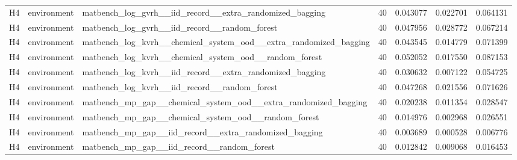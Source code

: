 \documentclass[10pt]{article}
\begin{document}
\begin{landscape}
\begin{longtable}{L{.35in}L{.6in}L{3.55in}L{.4in}L{.88in}L{.88in}L{.88in}}
H4 & environment & matbench\_\allowbreak{}log\_\allowbreak{}gvrh\_\allowbreak{}\_\allowbreak{}iid\_\allowbreak{}record\_\allowbreak{}\_\allowbreak{}extra\_\allowbreak{}randomized\_\allowbreak{}bagging & 40 & 0.043077 & 0.022701 & 0.064131\\
H4 & environment & matbench\_\allowbreak{}log\_\allowbreak{}gvrh\_\allowbreak{}\_\allowbreak{}iid\_\allowbreak{}record\_\allowbreak{}\_\allowbreak{}random\_\allowbreak{}forest & 40 & 0.047956 & 0.028772 & 0.067214\\
H4 & environment & matbench\_\allowbreak{}log\_\allowbreak{}kvrh\_\allowbreak{}\_\allowbreak{}chemical\_\allowbreak{}system\_\allowbreak{}ood\_\allowbreak{}\_\allowbreak{}extra\_\allowbreak{}randomized\_\allowbreak{}bagging & 40 & 0.043545 & 0.014779 & 0.071399\\
H4 & environment & matbench\_\allowbreak{}log\_\allowbreak{}kvrh\_\allowbreak{}\_\allowbreak{}chemical\_\allowbreak{}system\_\allowbreak{}ood\_\allowbreak{}\_\allowbreak{}random\_\allowbreak{}forest & 40 & 0.052052 & 0.017550 & 0.087153\\
H4 & environment & matbench\_\allowbreak{}log\_\allowbreak{}kvrh\_\allowbreak{}\_\allowbreak{}iid\_\allowbreak{}record\_\allowbreak{}\_\allowbreak{}extra\_\allowbreak{}randomized\_\allowbreak{}bagging & 40 & 0.030632 & 0.007122 & 0.054725\\
H4 & environment & matbench\_\allowbreak{}log\_\allowbreak{}kvrh\_\allowbreak{}\_\allowbreak{}iid\_\allowbreak{}record\_\allowbreak{}\_\allowbreak{}random\_\allowbreak{}forest & 40 & 0.047268 & 0.021556 & 0.071626\\
H4 & environment & matbench\_\allowbreak{}mp\_\allowbreak{}gap\_\allowbreak{}\_\allowbreak{}chemical\_\allowbreak{}system\_\allowbreak{}ood\_\allowbreak{}\_\allowbreak{}extra\_\allowbreak{}randomized\_\allowbreak{}bagging & 40 & 0.020238 & 0.011354 & 0.028547\\
H4 & environment & matbench\_\allowbreak{}mp\_\allowbreak{}gap\_\allowbreak{}\_\allowbreak{}chemical\_\allowbreak{}system\_\allowbreak{}ood\_\allowbreak{}\_\allowbreak{}random\_\allowbreak{}forest & 40 & 0.014976 & 0.002968 & 0.026551\\
H4 & environment & matbench\_\allowbreak{}mp\_\allowbreak{}gap\_\allowbreak{}\_\allowbreak{}iid\_\allowbreak{}record\_\allowbreak{}\_\allowbreak{}extra\_\allowbreak{}randomized\_\allowbreak{}bagging & 40 & 0.003689 & 0.000528 & 0.006776\\
H4 & environment & matbench\_\allowbreak{}mp\_\allowbreak{}gap\_\allowbreak{}\_\allowbreak{}iid\_\allowbreak{}record\_\allowbreak{}\_\allowbreak{}random\_\allowbreak{}forest & 40 & 0.012842 & 0.009068 & 0.016453\\

\end{longtable}
\end{landscape}
\end{document}
